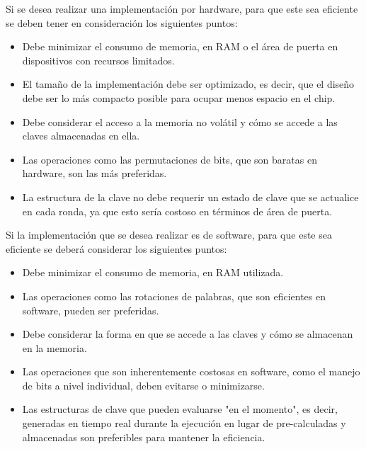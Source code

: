 \documentclass[a4paper,10pt]{article}
\begin{document}
	Si se desea realizar una implementación por hardware, para que este sea eficiente se deben tener en consideración los siguientes puntos:
	\begin{itemize}
		\item Debe minimizar el consumo de memoria, en RAM o el área de puerta en dispositivos con recursos limitados.
		\item El tamaño de la implementación debe ser optimizado, es decir, que el diseño debe ser lo más compacto posible para ocupar menos espacio en el chip.
		\item Debe considerar el acceso a la memoria no volátil y cómo se accede a las claves almacenadas en ella.
		\item Las operaciones como las permutaciones de bits, que son baratas en hardware, son las más preferidas.
		\item La estructura de la clave no debe requerir un estado de clave que se actualice en cada ronda, ya que esto sería costoso en términos de área de puerta.
	\end{itemize}
	Si la implementación que se desea realizar es de software, para que este sea eficiente se deberá considerar los siguientes puntos:
	\begin{itemize}
		\item Debe minimizar el consumo de memoria, en RAM utilizada.
		\item Las operaciones como las rotaciones de palabras, que son eficientes en software, pueden ser preferidas.
		\item Debe considerar la forma en que se accede a las claves y cómo se almacenan en la memoria.
		\item Las operaciones que son inherentemente costosas en software, como el manejo de bits a nivel individual, deben evitarse o minimizarse.
		\item Las estructuras de clave que pueden evaluarse "en el momento", es decir, generadas en tiempo real durante la ejecución en lugar de pre-calculadas y almacenadas son preferibles para mantener la eficiencia.
	\end{itemize}
\end{document}

